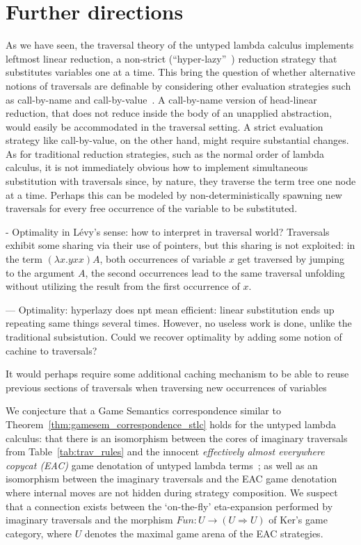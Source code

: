 \documentclass{elsarticle}
\theoremstyle{plain}
\theoremstyle{definition}
\theoremstyle{remark}
\begin{document}
\section{Further directions}

As we have seen, the traversal theory of the untyped lambda calculus implements leftmost linear reduction, a non-strict (``hyper-lazy''~\cite{danosherbelinregnier1996}) reduction strategy that substitutes variables one at a time. This bring the question of whether alternative notions of traversals are definable by considering other evaluation strategies such as call-by-name and call-by-value~\cite{plotkin-75}. A call-by-name version of head-linear reduction, that does not reduce inside the body of an unapplied abstraction, would easily be accommodated in the traversal setting. A strict evaluation strategy like call-by-value, on the other hand, might require substantial changes. As for traditional reduction strategies, such as the normal order of lambda calculus, it is not immediately obvious how to implement simultaneous substitution with traversals since, by nature, they traverse the term tree one node at a time. Perhaps this can be modeled by non-deterministically spawning new traversals for every free occurrence of the variable to be substituted.


\begin{todobox}
- Optimality in L\'evy's sense: how to interpret in traversal world?
Traversals exhibit some sharing via their use of pointers, but this sharing is not exploited: in the term $(\lambda x. y x x) A$, both occurrences of variable $x$ get traversed by jumping to the argument $A$, the second occurrences lead to the same traversal unfolding without utilizing the result from the first occurrence of $x$.

--- Optimality: hyperlazy does npt mean efficient: linear substitution ends up repeating same things several times. However, no useless work is done, unlike the traditional subsistution. Could we recover optimality by adding some notion of cachine to traversals?

It would perhaps require some additional caching mechanism to be able to reuse previous sections of traversals when traversing new occurrences of variables

\end{todobox}


We conjecture that a Game Semantics correspondence similar
to Theorem~\ref{thm:gamesem_correspondence_stlc} holds for
the untyped lambda calculus: that there is an isomorphism between the cores of imaginary traversals from Table~\ref{tab:trav_rules} and the innocent \emph{effectively almost everywhere copycat (EAC)} game denotation of untyped lambda terms~\cite{KerThesis}; as well as an isomorphism between the imaginary traversals and the EAC game denotation where internal moves are not hidden during strategy composition. We suspect that a connection exists between the `on-the-fly' eta-expansion performed by imaginary traversals and the morphism $Fun : U \rightarrow (U \Rightarrow U)$ of Ker's game category, where $U$ denotes the maximal game arena of the EAC strategies.
\end{document}
